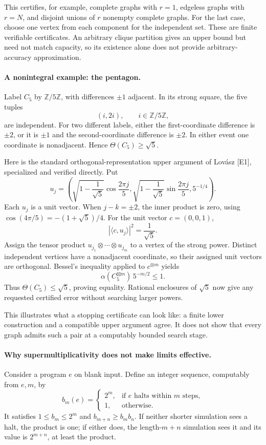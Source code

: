 \documentclass[11pt]{article}
\begin{document}
This certifies, for example, complete graphs with $r=1$, edgeless graphs with $r=N$, and disjoint unions of $r$ nonempty complete graphs. For the last case, choose one vertex from each component for the independent set. These are finite verifiable certificates. An arbitrary clique partition gives an upper bound but need not match capacity, so its existence alone does not provide arbitrary-accuracy approximation.

\paragraph{A nonintegral example: the pentagon.}
Label $C_5$ by $\mathbb Z/5\mathbb Z$, with differences $\pm1$ adjacent. In its strong square, the five tuples
\[
 (i,2i),\qquad i\in\mathbb Z/5\mathbb Z,
\]
are independent. For two different labels, either the first-coordinate difference is $\pm2$, or it is $\pm1$ and the second-coordinate difference is $\pm2$. In either event one coordinate is nonadjacent. Hence $\Theta(C_5)\ge\sqrt5$.

Here is the standard orthogonal-representation upper argument of Lovász [E1], specialized and verified directly. Put
\[
 u_j=\left(\sqrt{1-\frac1{\sqrt5}}\cos\frac{2\pi j}5,
           \sqrt{1-\frac1{\sqrt5}}\sin\frac{2\pi j}5,
           5^{-1/4}\right).
\]
Each $u_j$ is a unit vector. When $j-k=\pm2$, the inner product is zero, using
$\cos(4\pi/5)=-(1+\sqrt5)/4$. For the unit vector $c=(0,0,1)$,
\[
 |\langle c,u_j\rangle|^2=\frac1{\sqrt5}.
\]
Assign the tensor product $u_{j_1}\otimes\cdots\otimes u_{j_m}$ to a vertex of the strong power. Distinct independent vertices have a nonadjacent coordinate, so their assigned unit vectors are orthogonal. Bessel's inequality applied to $c^{\otimes m}$ yields
\[
 \alpha(C_5^{\boxtimes m})\,5^{-m/2}\le1.
\]
Thus $\Theta(C_5)\le\sqrt5$, proving equality. Rational enclosures of $\sqrt5$ now give any requested certified error without searching larger powers.

This illustrates what a stopping certificate can look like: a finite lower construction and a compatible upper argument agree. It does not show that every graph admits such a pair at a computably bounded search stage.

\paragraph{Why supermultiplicativity does not make limits effective.}
Consider a program $e$ on blank input. Define an integer sequence, computably from $e,m$, by
\[
 b_m(e)=
 \begin{cases}
  2^m,&\text{if }e\text{ halts within }m\text{ steps},\\
  1,&\text{otherwise}.
 \end{cases}
\]
It satisfies $1\le b_m\le2^m$ and $b_{m+n}\ge b_mb_n$. If neither shorter simulation sees a halt, the product is one; if either does, the length-$m+n$ simulation sees it and its value is $2^{m+n}$, at least the product.
\end{document}
